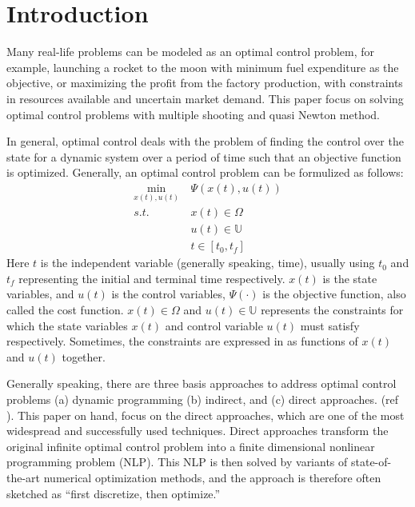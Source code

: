 \documentclass  [
  paper    = a4,
  BCOR     = 10mm,
  twoside,
  fontsize = 12pt,
  fleqn,
  toc      = bibnumbered,
  toc      = listofnumbered,
  numbers  = noendperiod,
  headings = normal,
  listof   = leveldown,
  version  = 3.03
]                                       {scrreprt}
\newcommand{\<}{\langle}
\renewcommand{\>}{\rangle}
\begin{document}
   
   \tableofcontents
    \let\clearpage\relax
   \newpage
   
   
 \chapter{Introduction}  
 \label{Chapter1}
Many real-life problems can be modeled as an optimal control problem, for example, launching a rocket to the moon with minimum fuel expenditure as the objective, or maximizing the profit from the factory production, with constraints in resources available and uncertain market demand. This paper focus on solving optimal control problems with multiple shooting and quasi Newton method. 

In general, optimal control deals with the problem of finding the control over the state for a dynamic system over a period of time such that an objective function is optimized. Generally, an optimal control problem can be formulized as follows: 
      \begin{equation}
   	\begin{aligned}
   	\underset{x(t), u(t)}{\text{min}}  \ &  \Psi(x(t), u(t)) \\
   		s.t.\ \  & x(t) \in \Omega \\
   		          & u(t) \in \mathbb{U}  \\
   		          & t \in [t_0, t_f]
   	\end{aligned}
   	\label{P1_OPH}
   \end{equation}
 Here $t$ is the independent variable (generally speaking, time), usually using $t_0$ and $t_f$ representing the initial and terminal time respectively. $x(t)$ is the state variables, and $u(t)$ is the control variables, $\Psi(\cdot)$ is the objective function, also called the cost function. $x(t) \in \Omega$ and  $ u(t) \in \mathbb{U}$ represents the constraints for which the state variables $x(t)$ and control variable $u(t)$ must satisfy respectively.  Sometimes, the constraints are expressed in as functions of $x(t)$ and $u(t)$ together. 
 

Generally speaking, there are three basis approaches to address optimal control problems (a) dynamic programming (b) indirect, and (c) direct approaches. (ref \cite{MHHP05}). This paper on hand, focus on the direct approaches, which are one of the most widespread and successfully used techniques. Direct approaches transform the original infinite optimal control problem into a finite dimensional nonlinear programming problem (NLP). This NLP is then solved by variants of state-of-the-art numerical optimization methods, and the approach is therefore often sketched as “first discretize, then optimize.” 
\end{document}
